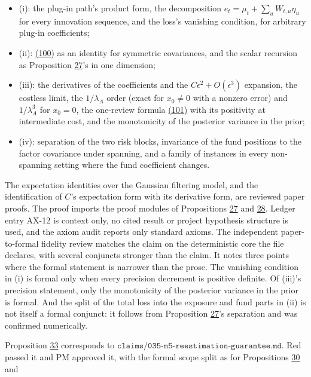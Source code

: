 \documentclass[11pt]{article}
\begin{document}
\begin{itemize}
  \item (i): the plug-in path's product form, the decomposition
  \(e_t=\mu_t+\sum_uW_{t,u}\eta_u\) for every innovation sequence, and the loss's
  vanishing condition, for arbitrary plug-in coefficients;
  \item (ii): \hyperref[eq:100]{(100)} as an identity for symmetric covariances, and the scalar
  recursion as Proposition \hyperref[res:Proposition-27]{27}'s in one dimension;
  \item (iii): the derivatives of the coefficients and the \(C\epsilon^2+O(\epsilon^3)\)
  expansion, the costless limit, the \(1/\lambda_A\) order (exact for \(x_0\neq0\)
  with a nonzero error) and \(1/\lambda_A^3\) for \(x_0=0\), the one-review
  formula \hyperref[eq:101]{(101)} with its positivity at intermediate cost, and the
  monotonicity of the posterior variance in the prior;
  \item (iv): separation of the two risk blocks, invariance of the fund
  positions to the factor covariance under spanning, and a family of
  instances in every non-spanning setting where the fund coefficient
  changes.
\end{itemize}

The expectation identities over the Gaussian filtering model, and the
identification of \(C\)'s expectation form with its derivative form, are
reviewed paper proofs. The proof imports the proof modules of
Propositions \hyperref[res:Proposition-27]{27} and \hyperref[res:Proposition-28]{28}. Ledger entry AX-12 is context only, no cited
result or project hypothesis structure is used, and the axiom audit
reports only standard axioms. The independent paper-to-formal
fidelity review matches the claim on the deterministic core the file
declares, with several conjuncts stronger than the claim. It notes
three points where the formal statement is narrower than the prose.
The vanishing condition in (i) is formal only when every precision
decrement is positive definite. Of (iii)'s precision statement, only
the monotonicity of the posterior variance in the prior is formal. And
the split of the total loss into the exposure and fund parts in (ii)
is not itself a formal conjunct: it follows from Proposition \hyperref[res:Proposition-27]{27}'s
separation and was confirmed numerically.

Proposition \hyperref[res:Proposition-33]{33} corresponds to
\(\texttt{claims/035-m5-reestimation-guarantee.md}\). Red passed it and
PM approved it, with the formal scope split as for Propositions \hyperref[res:Proposition-30]{30} and
\end{document}
